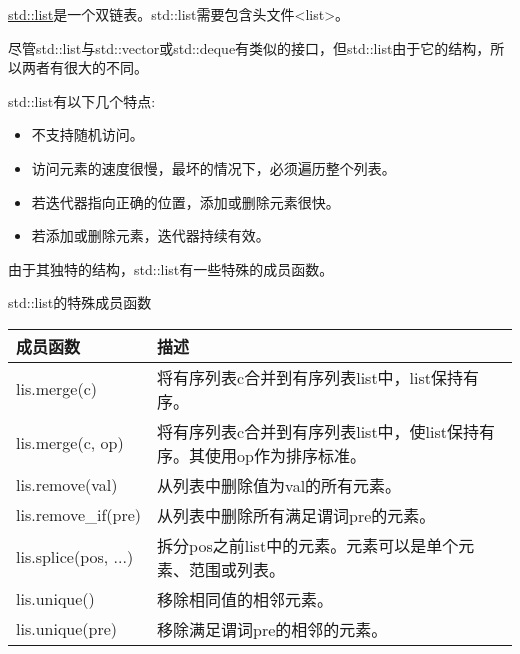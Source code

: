 

\href{http://en.cppreference.com/w/cpp/container/list}{std::list}是一个双链表。std::list需要包含头文件<list>。

尽管std::list与std::vector或std::deque有类似的接口，但std::list由于它的结构，所以两者有很大的不同。

std::list有以下几个特点:

\begin{itemize}
\item
不支持随机访问。

\item
访问元素的速度很慢，最坏的情况下，必须遍历整个列表。

\item
若迭代器指向正确的位置，添加或删除元素很快。

\item
若添加或删除元素，迭代器持续有效。
\end{itemize}

由于其独特的结构，std::list有一些特殊的成员函数。

\begin{center}
std::list的特殊成员函数
\end{center}

\begin{longtable}[c]{|l|l|}
\hline
\textbf{成员函数} & \textbf{描述}                                                         \\ \hline
\endfirsthead
%
\endhead
%
lis.merge(c)              & 将有序列表c合并到有序列表list中，list保持有序。 \\ \hline
lis.merge(c, op)     & 将有序列表c合并到有序列表list中，使list保持有序。其使用op作为排序标准。 \\ \hline
lis.remove(val)           & 从列表中删除值为val的所有元素。                                \\ \hline
lis.remove\_if(pre)       & 从列表中删除所有满足谓词pre的元素。                 \\ \hline
lis.splice(pos, ...) & 拆分pos之前list中的元素。元素可以是单个元素、范围或列表。                 \\ \hline
lis.unique()              & 移除相同值的相邻元素。                                \\ \hline
lis.unique(pre)           & 移除满足谓词pre的相邻的元素。                     \\ \hline
\end{longtable}

